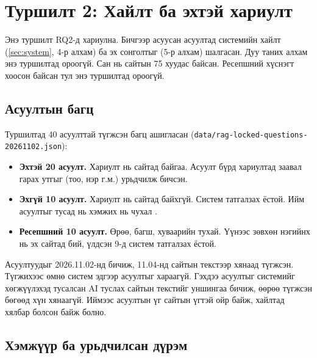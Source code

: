 \section{Туршилт 2: Хайлт ба эхтэй хариулт}
\label{sec:exp-rag}

Энэ туршилт RQ2-д хариулна. Бичгээр асуусан асуултад системийн хайлт (\ref{sec:system}, 4-р алхам) ба эх сонголтыг (5-р алхам) шалгасан. Дуу таних алхам энэ туршилтад ороогүй. Сан нь сайтын 75 хуудас байсан. Ресепшний хүснэгт хоосон байсан тул энэ туршилтад ороогүй.

\subsection{Асуултын багц}
\label{sec:rag-questions}

Туршилтад 40 асуулттай түгжсэн багц ашигласан (\texttt{data/\allowbreak rag-locked-questions-20261102.json}):
\begin{itemize}
    \item \textbf{Эхтэй 20 асуулт.} Хариулт нь сайтад байгаа. Асуулт бүрд хариултад заавал гарах утгыг (тоо, нэр г.м.) урьдчилж бичсэн.
    \item \textbf{Эхгүй 10 асуулт.} Хариулт нь сайтад байхгүй. Систем татгалзах ёстой. Ийм асуултыг тусад нь хэмжих нь чухал \cite{rajpurkar2018squad2}.
    \item \textbf{Ресепшний 10 асуулт.} Өрөө, багш, хуваарийн тухай. Үүнээс зөвхөн нэгийнх нь эх сайтад бий, үлдсэн 9-д систем татгалзах ёстой.
\end{itemize}
Асуултуудыг 2026.11.02-нд бичиж, 11.04-нд сайтын текстээр хянаад түгжсэн. Түгжихээс өмнө систем эдгээр асуултыг хараагүй. Гэхдээ асуултыг системийг хөгжүүлэхэд тусалсан AI туслах сайтын текстийг уншингаа бичиж, өөрөө түгжсэн бөгөөд хүн хянаагүй. Иймээс асуултын үг сайтын үгтэй ойр байж, хайлтад хялбар болсон байж болно.

\subsection{Хэмжүүр ба урьдчилсан дүрэм}
\label{sec:rag-metrics}

